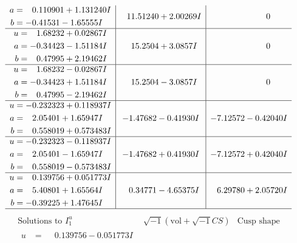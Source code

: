 \documentclass[1p]{elsarticle_modified}
\theoremstyle{definition}
\newcommand{\I}{\sqrt{-1}}
\begin{document}
$$\begin{array}{c|c|c}
\begin{aligned}
a &= \phantom{-}0.110901 + 1.131240 I \\
b &= -0.41531 - 1.65555 I\end{aligned}
 & \phantom{-}11.51240 + 2.00269 I & \phantom{-0.000000 } 0 \\ \hline\begin{aligned}
u &= \phantom{-}1.68232 + 0.02867 I \\
a &= -0.34423 - 1.51184 I \\
b &= \phantom{-}0.47995 + 2.19462 I\end{aligned}
 & \phantom{-}15.2504 + 3.0857 I & \phantom{-0.000000 } 0 \\ \hline\begin{aligned}
u &= \phantom{-}1.68232 - 0.02867 I \\
a &= -0.34423 + 1.51184 I \\
b &= \phantom{-}0.47995 - 2.19462 I\end{aligned}
 & \phantom{-}15.2504 - 3.0857 I & \phantom{-0.000000 } 0 \\ \hline\begin{aligned}
u &= -0.232323 + 0.118937 I \\
a &= \phantom{-}2.05401 + 1.65947 I \\
b &= \phantom{-}0.558019 + 0.573483 I\end{aligned}
 & -1.47682 - 0.41930 I & -7.12572 - 0.42040 I \\ \hline\begin{aligned}
u &= -0.232323 - 0.118937 I \\
a &= \phantom{-}2.05401 - 1.65947 I \\
b &= \phantom{-}0.558019 - 0.573483 I\end{aligned}
 & -1.47682 + 0.41930 I & -7.12572 + 0.42040 I \\ \hline\begin{aligned}
u &= \phantom{-}0.139756 + 0.051773 I \\
a &= \phantom{-}5.40801 + 1.65564 I \\
b &= -0.39225 + 1.47645 I\end{aligned}
 & \phantom{-}0.34771 - 4.65375 I & \phantom{-}6.29780 + 2.05720 I\\
 \hline 
 \end{array}$$\newpage$$\begin{array}{c|c|c}  
\text{Solutions to }I^u_{1}& \I (\text{vol} + \sqrt{-1}CS) & \text{Cusp shape}\\
 \hline 
\begin{aligned}
u &= \phantom{-}0.139756 - 0.051773 I \\

\end{aligned}
\end{array}$$
\end{document}
